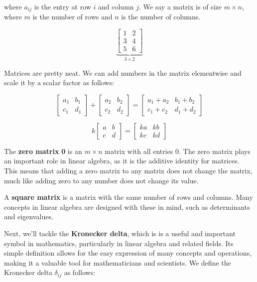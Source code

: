 \documentclass{report}
\begin{document}
\begin{onehalfspacing}
\begin{flushleft}
where \(a_{ij}\) is the entry at row \(i\) and column \(j\). We say a matrix is of size \(m \times n\), where \(m\) is the number of rows and \(n\) is the number of columns.

\vspace{-0.1in}
\[\underbrace{\begin{bmatrix}
    1 & 2 \\ 3 & 4 \\ 5 & 6
\end{bmatrix}
}_{3\times 2}\]

Matrices are pretty neat. We can add numbers in the matrix elementwise and scale it by a scalar factor as follows:

\vspace{-0.1in}
\[\begin{bmatrix}
    a_1 & b_1 \\ c_1 & d_1
\end{bmatrix} + \begin{bmatrix}
    a_2 & b_2 \\ c_2 & d_2
\end{bmatrix} = \begin{bmatrix}
    a_1 + a_2 & b_1 + b_2 \\ c_1 + c_2 & d_1 + d_2
\end{bmatrix}\]

\[ k \begin{bmatrix}
    a & b \\ c & d
\end{bmatrix} = \begin{bmatrix}
    ka & kb \\ kc & kd
\end{bmatrix}\]

The \textbf{zero matrix} \textbf{0} is an \(m\times n\) matrix with all entries 0. The zero matrix plays an important role in linear algebra, as it is the additive identity for matrices. This means that adding a zero matrix to any matrix does not change the matrix, much like adding zero to any number does not change its value.

\medskip

A \textbf{square matrix} is a matrix with the same number of rows and columns. Many concepts in linear algebra are designed with these in mind, such as determinants and eigenvalues.

\medskip

Next, we'll tackle the \textbf{Kronecker delta}, which is  is a useful and important symbol in mathematics, particularly in linear algebra and related fields. Its simple definition allows for the easy expression of many concepts and operations, making it a valuable tool for mathematicians and scientists. We define the Kronecker delta \(\delta_{ij}\) as follows:


\end{flushleft}
\end{onehalfspacing}
\end{document}
